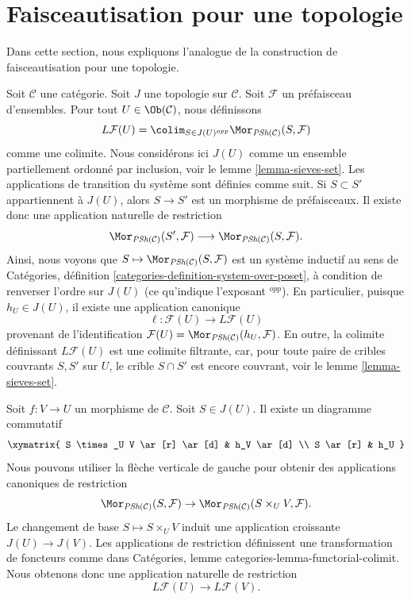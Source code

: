 
















\section{Faisceautisation pour une topologie}
\label{section-sheafification-topology}

\noindent
Dans cette section, nous expliquons l'analogue de la
construction de faisceautisation pour une topologie.

\medskip\noindent
Soit $\mathcal{C}$ une catégorie.
Soit $J$ une topologie sur $\mathcal{C}$.
Soit $\mathcal{F}$ un préfaisceau d'ensembles.
Pour tout $U \in \Ob(\mathcal{C})$, nous
définissons
$$
L\mathcal{F}(U)
=
\colim_{S \in J(U)^{opp}}
\Mor_{\textit{PSh}(\mathcal{C})}(S, \mathcal{F})
$$
comme une colimite. Nous considérons ici $J(U)$ comme un ensemble
partiellement ordonné par inclusion, voir le lemme \ref{lemma-sieves-set}. Les
applications de transition du système sont définies comme suit.
Si $S \subset S'$ appartiennent à $J(U)$, alors $S \to S'$ est
un morphisme de préfaisceaux. Il existe donc une application naturelle
de restriction
$$
\Mor_{\textit{PSh}(\mathcal{C})}(S', \mathcal{F})
\longrightarrow
\Mor_{\textit{PSh}(\mathcal{C})}(S, \mathcal{F}).
$$
Ainsi, nous voyons que
$S \mapsto \Mor_{\textit{PSh}(\mathcal{C})}(S, \mathcal{F})$
est un système inductif au sens de Catégories,
définition \ref{categories-definition-system-over-poset},
à condition de renverser l'ordre
sur $J(U)$ (ce qu'indique l'exposant ${}^{opp}$).
En particulier, puisque $h_U \in J(U)$,
il existe une application canonique
$$
\ell : \mathcal{F}(U) \longrightarrow L\mathcal{F}(U)
$$
provenant de l'identification
$\mathcal{F}(U) = \Mor_{\textit{PSh}(\mathcal{C})}(h_U, \mathcal{F})$.
En outre, la colimite définissant $L\mathcal{F}(U)$ est une colimite filtrante,
car, pour toute paire de cribles couvrants $S, S'$ sur $U$, le
crible $S \cap S'$ est encore couvrant, voir le lemme \ref{lemma-sieves-set}.

\medskip\noindent
Soit $f : V \to U$ un morphisme de $\mathcal{C}$.
Soit $S \in J(U)$. Il existe un diagramme commutatif
$$
\xymatrix{
S \times_U V \ar[r] \ar[d] & h_V \ar[d] \\
S \ar[r] & h_U
}
$$
Nous pouvons utiliser la flèche verticale de gauche pour obtenir des applications canoniques de restriction
$$
\Mor_{\textit{PSh}(\mathcal{C})}(S, \mathcal{F})
\to \Mor_{\textit{PSh}(\mathcal{C})}(S \times_U V, \mathcal{F}).
$$
Le changement de base $S \mapsto S \times_U V$ induit une application
croissante $J(U) \to J(V)$. Les applications de restriction
définissent une transformation de foncteurs comme dans
Catégories, lemme {categories-lemma-functorial-colimit}.
Nous obtenons donc une application naturelle de restriction
$$
L\mathcal{F}(U) \longrightarrow L\mathcal{F}(V).
$$

